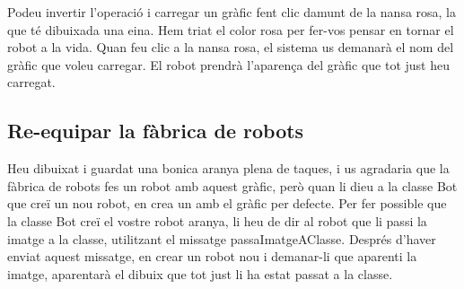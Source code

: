 Podeu invertir l'operació i carregar un gràfic fent clic damunt de la nansa rosa, la que té dibuixada una eina. Hem triat el color rosa per fer-vos pensar en tornar el robot a la vida. Quan feu clic a la nansa rosa, el sistema us demanarà el nom del gràfic que voleu carregar. El robot prendrà l'aparença del gràfic que tot just heu carregat.

\subsection{Re-equipar la fàbrica de robots}
Heu dibuixat i guardat una bonica aranya plena de taques, i us agradaria que la fàbrica de robots fes un robot amb aquest gràfic, però quan li dieu a la classe \textsf{Bot} que creï un nou robot, en crea un amb el gràfic per defecte. Per fer possible que la classe \textsf{Bot} creï el vostre robot aranya, li heu de dir al robot que li passi la imatge a la classe, utilitzant el missatge \textsf{passaImatgeAClasse}. Després d'haver enviat aquest missatge, en crear un robot nou i demanar-li que aparenti la imatge, aparentarà el dibuix que tot just li ha estat passat a la classe. 

